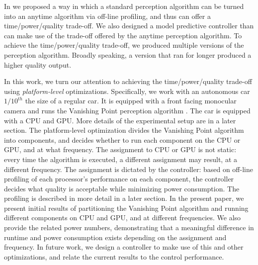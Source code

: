 In \cite{RTSS15} we proposed a way in which a standard perception algorithm can be turned into an anytime algorithm via off-line profiling, and thus can offer a time/power/quality trade-off.
We also designed a model predictive controller than can make use of the trade-off offered by the anytime perception algorithm.
To achieve the time/power/quality trade-off, we produced multiple versions of the perception algorithm.
Broadly speaking, a version that ran for longer produced a higher quality output. 

In this work, we turn our attention to achieving the time/power/quality trade-off using \emph{platform-level} optimizations.
Specifically, we work with an autonomous car $1/10^{th}$ the size of a regular car. 
It is equipped with a front facing monocular camera and runs the Vanishing Point perception algorithm \cite{VP1}. 
The car is equipped with a CPU and GPU. More details of the experimental setup are in a later section.
The platform-level optimization divides the Vanishing Point algorithm into components, and decides whether to run each component on the CPU or GPU, and at what frequency.
The assignment to CPU or GPU is not static: every time the algorithm is executed, a different assignment may result, at a different frequency.
The assignment is dictated by the controller: based on off-line profiling of each processor's performance on each component, the controller decides what quality is acceptable while minimizing power consumption. The profiling is described in more detail in a later section.
In the present paper, we present initial results of partitioning the Vanishing Point algorithm and running different components on CPU and GPU, and at different frequencies.
We also provide the related power numbers, demonstrating that a meaningful difference in runtime and power consumption exists depending on the assignment and frequency.
In future work, we design a controller to make use of this and other optimizations, and relate the current results to the control performance.
%
%
%
